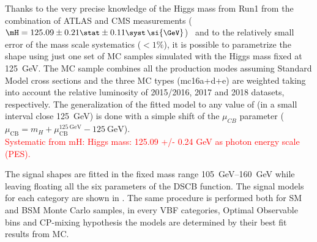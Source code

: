 Thanks to the very precise knowledge of the Higgs mass from Run1 from the combination of ATLAS and CMS measurements ($\mH=125.09\err{0.21}\stat\err{0.11}\syst \, \si{\GeV}$)~\cite{HIGG-2014-14} and to the relatively small error of the mass scale systematics ($<1\%$), it is possible to parametrize the shape using just one set of MC samples simulated with the Higgs mass \mH fixed at \SI{125}{\GeV}. The MC sample combines all the production modes assuming Standard Model cross sections and the three MC types (mc16a+d+e) are weighted taking into account the relative luminosity of 2015/2016, 2017 and 2018 datasets, respectively. The generalization of the fitted model to any value of \mH (in a small interval close \SI{125}{\GeV}) is done with a simple shift of the $\mu_{CB}$ parameter ($\mu_\text{CB}= m_H + \mu_\text{CB}^{\SI{125}{\GeV}} - \SI{125}{\GeV}$).\\

\textcolor{red}{Systematic from mH:  Higgs mass: 125.09 +/- 0.24 GeV as photon energy scale (PES).}

The signal shapes are fitted in the fixed mass range \SIrange{105}{160}{\GeV} while leaving floating all the six parameters of the DSCB function. The signal models for each category are shown in \Fig{\ref{fig:signal_shapes}}. The same procedure is performed both for SM and BSM Monte Carlo samples, in every VBF categories, Optimal Observable bins and CP-mixing hypothesis the \myy models are determined by their best fit results from MC.


